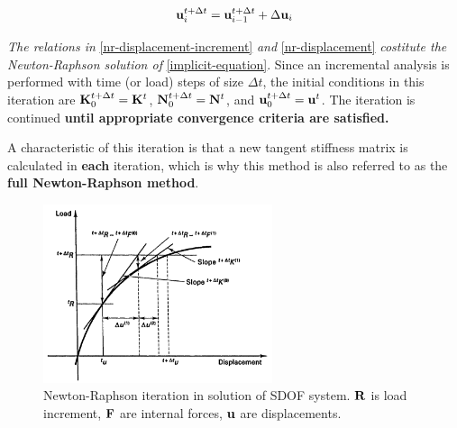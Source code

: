 \begin{equation}\label{nr-displacement}
    \mathbf{u}_i^{t + \Delta t} =
    \mathbf{u}_{i-1}^{t + \Delta t} +
    \Delta \mathbf{u}_{i}
\end{equation}

\textit{The relations in} \eqref{nr-displacement-increment} \textit{and} \eqref{nr-displacement}
\textit{costitute the Newton-Raphson solution of} \eqref{implicit-equation}.
Since an incremental analysis is performed with time (or load) steps of size
$ \Delta t $, the initial conditions in this iteration are
$ \mathbf{K}_0^{t + \Delta t} = \mathbf{K}^t $,
$ \mathbf{N}_0^{t + \Delta t} = \mathbf{N}^t $, and
$ \mathbf{u}_0^{t + \Delta t} = \mathbf{u}^t $.
The iteration is continued \textbf{until appropriate convergence criteria are satisfied.}

A characteristic of this iteration is that a new tangent stiffness matrix is
calculated in \textbf{each} iteration, which is why this method is also referred
to as the \textbf{full Newton-Raphson method}.

\begin{figure}[ht]
    \centering
    \includegraphics[width=0.60\textwidth]{img/full_newton_raphson.png}
    \caption{Newton-Raphson iteration in solution of SDOF system.
    $ \mathbf{R} $ is load increment, $ \mathbf{F} $ are internal forces,
    $ \mathbf{u} $ are displacements.}
    \label{fig:full-newton-raphson-png}
\end{figure}


